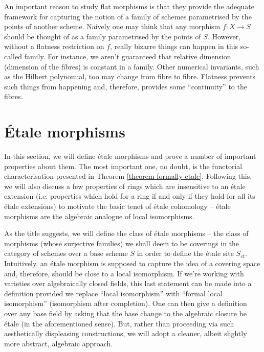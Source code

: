 \noindent
An important reason to study flat morphisms is that they provide the adequate
framework for capturing the notion of a family of schemes parametrised by the
points of another scheme. Naively one may think that any morphism $f:X \to S$
should be thought of as a family parametrised by the points of $S$. However,
without a flatness restriction on $f$, really bizarre things can happen in
this so-called family. For instance, we aren't guaranteed that relative
dimension (dimension of the fibres) is constant in a family. Other numerical
invariants, such as the Hilbert polynomial, too may change from fibre to
fibre. Flatness prevents such things from happening and, therefore, provides
some ``continuity'' to the fibres. 

\section{\'Etale morphisms}
\label{section-etale-moprhisms}

\noindent
In this section, we will define \'etale morphisms and prove a number of
important properties about them. The most important one, no doubt, is the
functorial characterisation presented in Theorem \ref{theorem-formally-etale}.
Following this, we will also discuss a few properties of rings which are
insensitive to an \'etale extension (i.e: properties which hold for a ring
if and only if they hold for all its \'etale extensions) to motivate the basic
tenet of \'etale cohomology -- \'etale morphisms are the algebraic analogue of
local isomorphisms.

\medskip\noindent
As the title suggests, we will define the class of \'etale morphisms -- the
class of morphisms (whose surjective families) we shall deem to be coverings
in the category of schemes over a base scheme $S$ in order to define the
\'etale site $S_{et}$. Intuitively, an \'etale morphism is supposed to
capture the idea of a covering space and, therefore, should be close to a
local isomorphism. If we're working with varieties over algebraically closed
fields, this last statement can be made into a definition provided we replace
``local isomorphism'' with ``formal local isomorphism'' (isomorphism after
completion). One can then give a definition over any base field by asking
that the base change to the algebraic closure be \'etale (in the
aforementioned sense). But, rather than proceeding via such aesthetically
displeasing constructions, we will adopt a cleaner, albeit slightly more
abstract, algebraic approach.

